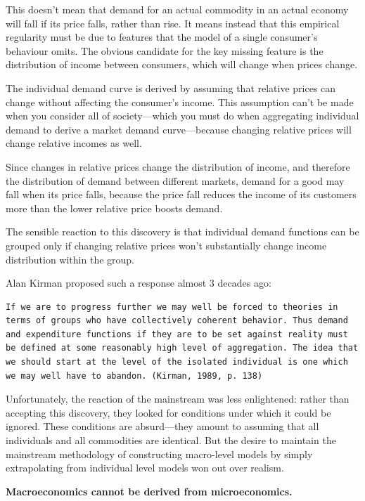 \documentclass[
]{book}
\begin{document}
This doesn't mean that demand for an actual commodity in an actual economy will fall if its price falls, rather than rise. It means instead that this empirical regularity must be due to features that the model of a single consumer's behaviour omits. The obvious candidate for the key missing feature is the distribution of income between consumers, which will change when prices change.

The individual demand curve is derived by assuming that relative prices can change without affecting the consumer's income. This assumption can't be made when you consider all of society---which you must do when aggregating individual demand to derive a market demand curve---because changing relative prices will change relative incomes as well.

Since changes in relative prices change the distribution of income, and therefore the distribution of demand between different markets, demand for a good may fall when its price falls, because the price fall reduces the income of its customers more than the lower relative price boosts demand.

The sensible reaction to this discovery is that individual demand functions can be grouped only if changing relative prices won't substantially change income distribution within the group.

Alan Kirman proposed such a response almost 3 decades ago:

\begin{verbatim}
If we are to progress further we may well be forced to theories in terms of groups who have collectively coherent behavior. Thus demand and expenditure functions if they are to be set against reality must be defined at some reasonably high level of aggregation. The idea that we should start at the level of the isolated individual is one which we may well have to abandon. (Kirman, 1989, p. 138)
\end{verbatim}

Unfortunately, the reaction of the mainstream was less enlightened: rather than accepting this discovery, they looked for conditions under which it could be ignored. These conditions are absurd---they amount to assuming that all individuals and all commodities are identical. But the desire to maintain the mainstream methodology of constructing macro-level models by simply extrapolating from individual level models won out over realism.

\textbf{Macroeconomics cannot be derived from microeconomics.}
\end{document}
